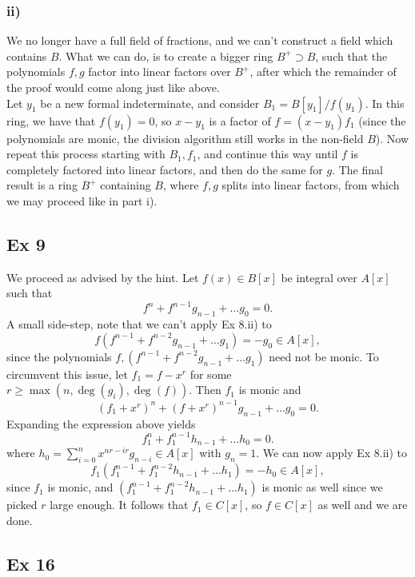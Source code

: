 \documentclass{article}
\theoremstyle{definition}
\begin{document}
\subsubsection*{ii)}

We no longer have a full field of fractions, and we can't construct a field
which contains $B$. What we can do, is to create a bigger ring $B^{+} \supset
B$, such that the polynomials $f, g$ factor into linear factors over $B^{+}$,
after which the remainder of the proof would come along just like above. \\

Let $y_1$ be a new formal indeterminate, and consider $B_1 = B[y_1]/f(y_1)$. In
this ring, we have that $f(y_1) = 0$, so $x - y_1$ is a factor of $f = (x -
y_1)f_1$ (since the polynomials are monic, the division algorithm still works
in the non-field $B$). Now repeat this process starting with $B_1, f_1$, and
continue this way until $f$ is completely factored into linear factors, and
then do the same for $g$. The final result is a ring $B^{+}$ containing $B$,
where $f, g$ splits into linear factors, from which we may proceed like in part
i).


\subsection*{Ex 9}

We proceed as advised by the hint. Let $f(x) \in B[x]$ be integral over $A[x]$ such that 
\[
	f^{n} + f^{n - 1}g_{n-1} + \ldots g_{0} = 0.
\] 
A small side-step, note that we can't apply Ex 8.ii) to 
\[
	f(f^{n - 1} + f^{n - 2}g_{n - 1} + \ldots g_1) = -g_0 \in A[x],
\] 
since the polynomials $f, (f^{n - 1} + f^{n - 2}g_{n - 1} + \ldots g_1)$ need
not be monic. To circumvent this issue, let $f_1 = f - x^{r}$ for some $r \geq
\max(n, \deg(g_i), \deg(f))$. Then $f_1$ is monic and
\[
	(f_1 + x^{r})^{n} + (f + x^{r})^{n - 1}g_{n-1} + \ldots g_{0} = 0.
\] 
Expanding the expression above yields
\[
	f_1^{n} + f_1^{n - 1}h_{n-1} + \ldots h_{0} = 0.
\] 
where $h_0 = \sum_{i = 0}^{n} x^{nr - ir}g_{n - i} \in A[x]$ with $g_n = 1$. We
can now apply Ex 8.ii) to
\[
	f_1 (f_1^{n-1} + f_1^{n - 2}h_{n-1} + \ldots h_{1}) = -h_0 \in A[x],
\] 
since $f_1$ is monic, and $(f_1^{n-1} + f_1^{n - 2}h_{n-1} + \ldots h_{1})$ is
monic as well since we picked $r$ large enough. It follows that $f_1 \in C[x]$,
so $f \in C[x]$ as well and we are done.

\subsection*{Ex 16}
\end{document}
